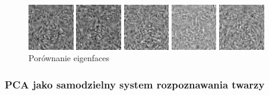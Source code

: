 \documentclass{article}
\begin{document}
\begin{figure}
	\begin{minipage}{2cm}
		\includegraphics[width=2cm]{392.jpg}
	\end{minipage}
	\begin{minipage}{2cm}
		\includegraphics[width=2cm]{393.jpg}
	\end{minipage}
	\begin{minipage}{2cm}
		\includegraphics[width=2cm]{394.jpg}
	\end{minipage}
	\begin{minipage}{2cm}
		\includegraphics[width=2cm]{395.jpg}
	\end{minipage}
	\begin{minipage}{2cm}
		\includegraphics[width=2cm]{396.jpg}
	\end{minipage}
	
	\caption{Porównanie eigenfaces}
	\label{fig:eigenfaces}
\end{figure}








\subsubsection{PCA jako samodzielny system rozpoznawania twarzy}
 
\end{document}
